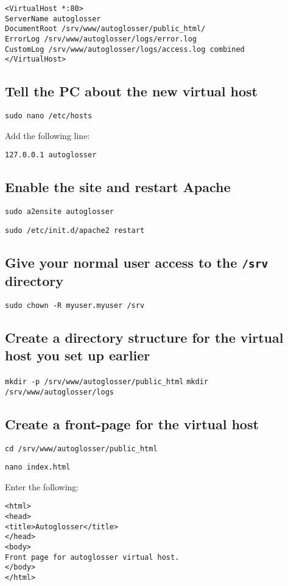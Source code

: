 \documentclass[a4paper,10pt]{article}
\begin{document}
\begin{verbatim}
<VirtualHost *:80>
ServerName autoglosser
DocumentRoot /srv/www/autoglosser/public_html/
ErrorLog /srv/www/autoglosser/logs/error.log
CustomLog /srv/www/autoglosser/logs/access.log combined
</VirtualHost>
\end{verbatim}

\subsection{Tell the PC about the new virtual host}

\texttt{sudo nano /etc/hosts}

Add the following line:

\texttt{127.0.0.1	autoglosser}

\subsection{Enable the site and restart Apache}

\texttt{sudo a2ensite autoglosser}

\texttt{sudo /etc/init.d/apache2 restart}

\subsection{Give your normal user access to the \texttt{/srv} directory}

\texttt{sudo chown -R myuser.myuser /srv}

\subsection{Create a directory structure for the virtual host you set up earlier}

\texttt{mkdir -p /srv/www/autoglosser/public\_html}
\texttt{mkdir /srv/www/autoglosser/logs}

\subsection{Create a front-page for the virtual host}
\label{subsec:create-front-page}

\texttt{cd /srv/www/autoglosser/public\_html}

\texttt{nano index.html}

Enter the following:

\begin{verbatim}
<html>
<head>
<title>Autoglosser</title>
</head>
<body>
Front page for autoglosser virtual host.
</body>
</html>
\end{verbatim}
\end{document}
